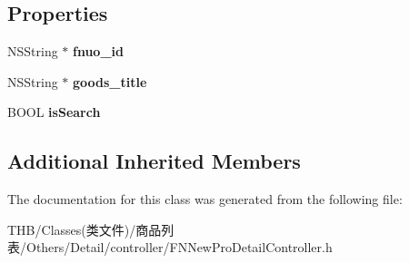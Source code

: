 \subsection*{Properties}
\begin{DoxyCompactItemize}
\item 
\mbox{\label{interface_f_n_new_pro_detail_controller_ab04489242c4104ea594aaffe9b701626}} 
N\+S\+String $\ast$ {\bfseries fnuo\+\_\+id}
\item 
\mbox{\label{interface_f_n_new_pro_detail_controller_a35da4d53b3a280c873b441b7fe605fa7}} 
N\+S\+String $\ast$ {\bfseries goods\+\_\+title}
\item 
\mbox{\label{interface_f_n_new_pro_detail_controller_a5facd7d3fc5f30b1f32fee02af1092a1}} 
B\+O\+OL {\bfseries is\+Search}
\end{DoxyCompactItemize}
\subsection*{Additional Inherited Members}


The documentation for this class was generated from the following file\+:\begin{DoxyCompactItemize}
\item 
T\+H\+B/\+Classes(类文件)/商品列表/\+Others/\+Detail/controller/F\+N\+New\+Pro\+Detail\+Controller.\+h\end{DoxyCompactItemize}
